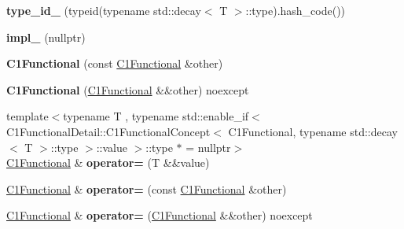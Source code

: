 \begin{DoxyCompactItemize}
\item 
\hypertarget{classSpacy_1_1C1Functional_a14837fc6ca91107fb783851a31aaa5e3}{{\bfseries type\-\_\-id\-\_\-} (typeid(typename std\-::decay$<$ \-T $>$\-::type).hash\-\_\-code())}\label{classSpacy_1_1C1Functional_a14837fc6ca91107fb783851a31aaa5e3}

\item 
\hypertarget{classSpacy_1_1C1Functional_a07ae129282ab98fd99126cd81bcd0b30}{{\bfseries impl\-\_\-} (nullptr)}\label{classSpacy_1_1C1Functional_a07ae129282ab98fd99126cd81bcd0b30}

\item 
\hypertarget{classSpacy_1_1C1Functional_a8d21587d3af612977b1d054a1997d813}{{\bfseries \-C1\-Functional} (const \hyperlink{classSpacy_1_1C1Functional}{\-C1\-Functional} \&other)}\label{classSpacy_1_1C1Functional_a8d21587d3af612977b1d054a1997d813}

\item 
\hypertarget{classSpacy_1_1C1Functional_a575dc479928f798cae8ad12285ec7563}{{\bfseries \-C1\-Functional} (\hyperlink{classSpacy_1_1C1Functional}{\-C1\-Functional} \&\&other) noexcept}\label{classSpacy_1_1C1Functional_a575dc479928f798cae8ad12285ec7563}

\item 
\hypertarget{classSpacy_1_1C1Functional_a1a6c4893ea11ebeff6647fc12f8b979d}{{\footnotesize template$<$typename T , typename std\-::enable\-\_\-if$<$ C1\-Functional\-Detail\-::\-C1\-Functional\-Concept$<$ C1\-Functional, typename std\-::decay$<$ T $>$\-::type $>$\-::value $>$\-::type $\ast$  = nullptr$>$ }\\\hyperlink{classSpacy_1_1C1Functional}{\-C1\-Functional} \& {\bfseries operator=} (\-T \&\&value)}\label{classSpacy_1_1C1Functional_a1a6c4893ea11ebeff6647fc12f8b979d}

\item 
\hypertarget{classSpacy_1_1C1Functional_a31c2416c61d514298b7ac06526081dae}{\hyperlink{classSpacy_1_1C1Functional}{\-C1\-Functional} \& {\bfseries operator=} (const \hyperlink{classSpacy_1_1C1Functional}{\-C1\-Functional} \&other)}\label{classSpacy_1_1C1Functional_a31c2416c61d514298b7ac06526081dae}

\item 
\hypertarget{classSpacy_1_1C1Functional_a3777c18d812c550efa28d866e5c196e1}{\hyperlink{classSpacy_1_1C1Functional}{\-C1\-Functional} \& {\bfseries operator=} (\hyperlink{classSpacy_1_1C1Functional}{\-C1\-Functional} \&\&other) noexcept}\label{classSpacy_1_1C1Functional_a3777c18d812c550efa28d866e5c196e1}


\end{DoxyCompactItemize}
